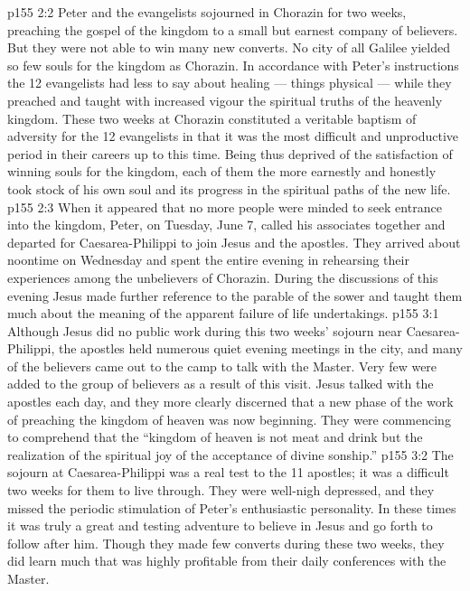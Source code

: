 \vs p155 2:2 Peter and the evangelists sojourned in Chorazin for two weeks, preaching the gospel of the kingdom to a small but earnest company of believers. But they were not able to win many new converts. No city of all Galilee yielded so few souls for the kingdom as Chorazin. In accordance with Peter’s instructions the 12 evangelists had less to say about healing --- things physical --- while they preached and taught with increased vigour the spiritual truths of the heavenly kingdom. These two weeks at Chorazin constituted a veritable baptism of adversity for the 12 evangelists in that it was the most difficult and unproductive period in their careers up to this time. Being thus deprived of the satisfaction of winning souls for the kingdom, each of them the more earnestly and honestly took stock of his own soul and its progress in the spiritual paths of the new life.
\vs p155 2:3 When it appeared that no more people were minded to seek entrance into the kingdom, Peter, on Tuesday, June 7, called his associates together and departed for Caesarea\hyp{}Philippi to join Jesus and the apostles. They arrived about noontime on Wednesday and spent the entire evening in rehearsing their experiences among the unbelievers of Chorazin. During the discussions of this evening Jesus made further reference to the parable of the sower and taught them much about the meaning of the apparent failure of life undertakings.
\vs p155 3:1 Although Jesus did no public work during this two weeks’ sojourn near Caesarea\hyp{}Philippi, the apostles held numerous quiet evening meetings in the city, and many of the believers came out to the camp to talk with the Master. Very few were added to the group of believers as a result of this visit. Jesus talked with the apostles each day, and they more clearly discerned that a new phase of the work of preaching the kingdom of heaven was now beginning. They were commencing to comprehend that the “kingdom of heaven is not meat and drink but the realization of the spiritual joy of the acceptance of divine sonship.”
\vs p155 3:2 The sojourn at Caesarea\hyp{}Philippi was a real test to the 11 apostles; it was a difficult two weeks for them to live through. They were well\hyp{}nigh depressed, and they missed the periodic stimulation of Peter’s enthusiastic personality. In these times it was truly a great and testing adventure to believe in Jesus and go forth to follow after him. Though they made few converts during these two weeks, they did learn much that was highly profitable from their daily conferences with the Master.
